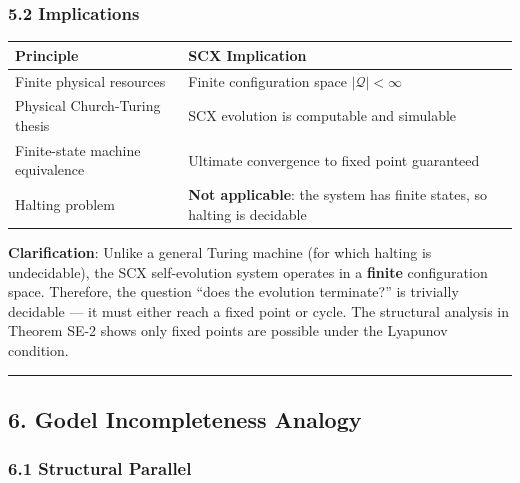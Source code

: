 \documentclass[
  12pt,
]{ctexart}
\begin{document}
\subsubsection{5.2 Implications}\label{implications}

\begin{longtable}[]{@{}
  >{\raggedright\arraybackslash}p{}
  >{\raggedright\arraybackslash}p{}@{}}
\toprule\noalign{}
\begin{minipage}[b]{\linewidth}\raggedright
Principle
\end{minipage} & \begin{minipage}[b]{\linewidth}\raggedright
SCX Implication
\end{minipage} \\
\midrule\noalign{}
\endhead
\bottomrule\noalign{}
\endlastfoot
Finite physical resources & Finite configuration space
\(|\mathcal{Q}| < \infty\) \\
Physical Church-Turing thesis & SCX evolution is computable and
simulable \\
Finite-state machine equivalence & Ultimate convergence to fixed point
guaranteed \\
Halting problem & \textbf{Not applicable}: the system has finite states,
so halting is decidable \\
\end{longtable}

\textbf{Clarification}: Unlike a general Turing machine (for which
halting is undecidable), the SCX self-evolution system operates in a
\textbf{finite} configuration space. Therefore, the question ``does the
evolution terminate?'' is trivially decidable --- it must either reach a
fixed point or cycle. The structural analysis in Theorem SE-2 shows only
fixed points are possible under the Lyapunov condition.

\begin{center}\rule{0.5\linewidth}{0.5pt}\end{center}

\subsection{6. Godel Incompleteness
Analogy}\label{godel-incompleteness-analogy}

\subsubsection{6.1 Structural Parallel}\label{structural-parallel}
\end{document}
